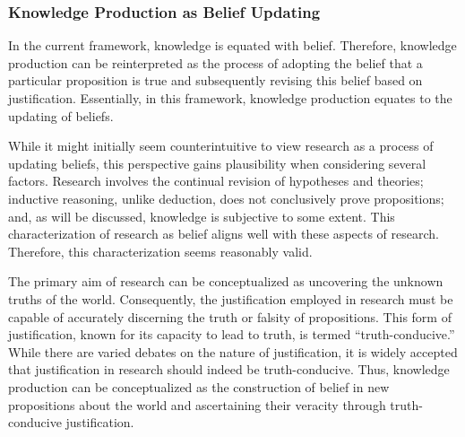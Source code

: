 \subsubsection{Knowledge Production as Belief Updating}
In the current framework, knowledge is equated with belief. Therefore, knowledge production can be reinterpreted as the process of adopting the belief that a particular proposition is true and subsequently revising this belief based on justification. Essentially, in this framework, knowledge production equates to the updating of beliefs.

While it might initially seem counterintuitive to view research as a process of updating beliefs, this perspective gains plausibility when considering several factors. Research involves the continual revision of hypotheses and theories; inductive reasoning, unlike deduction, does not conclusively prove propositions; and, as will be discussed, knowledge is subjective to some extent. This characterization of research as belief aligns well with these aspects of research. Therefore, this characterization seems reasonably valid.

The primary aim of research can be conceptualized as uncovering the unknown truths of the world. Consequently, the justification employed in research must be capable of accurately discerning the truth or falsity of propositions. This form of justification, known for its capacity to lead to truth, is termed ``truth-conducive.'' While there are varied debates on the nature of justification, it is widely accepted that justification in research should indeed be truth-conducive. Thus, knowledge production can be conceptualized as the construction of belief in new propositions about the world and ascertaining their veracity through truth-conducive justification.



